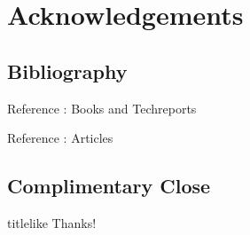 \documentclass[english]{pkuslide}
\begin{document}
\section{Acknowledgements}
\subsection{Bibliography}
	\begin{frame}{Reference : Books and Techreports}
\printbibliography[type = book]
\printbibliography[keyword = aaa]
	\end{frame}
\begin{frame}{Reference : Articles}
\printbibliography[type = article]
	\end{frame}

\subsection{Complimentary Close}

	\begin{frame}
\LARGE
\begin{beamercolorbox}[center, ht=3em]{titlelike}
\vspace{1em}
Thanks!
\end{beamercolorbox}
	\end{frame}

	
\end{document}
